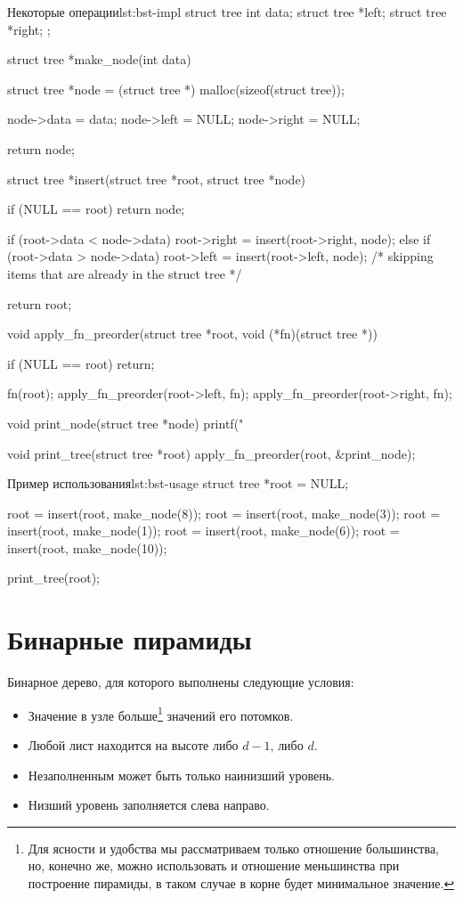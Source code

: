 \begin{clst}{Некоторые операции}{lst:bst-impl}
struct tree {
    int data;
    struct tree *left;
    struct tree *right;
};

struct tree *make_node(int data)
{
    struct tree *node = (struct tree *) malloc(sizeof(struct tree));

    node->data = data;
    node->left = NULL;
    node->right = NULL;

    return node;
}

struct tree *insert(struct tree *root, struct tree *node)
{
    if (NULL == root)
        return node;

    if (root->data < node->data)
        root->right = insert(root->right, node);
    else if (root->data > node->data)
        root->left = insert(root->left, node);
    /* skipping items that are already in the struct tree */

    return root;
}

void apply_fn_preorder(struct tree *root, void (*fn)(struct tree *))
{
    if (NULL == root)
        return;

    fn(root);
    apply_fn_preorder(root->left, fn);
    apply_fn_preorder(root->right, fn);
}

void print_node(struct tree *node) {
    printf("%
}

void print_tree(struct tree *root)
{
    apply_fn_preorder(root, &print_node);
}
\end{clst}

\begin{clst}{Пример использования}{lst:bst-usage}
struct tree *root = NULL;

root = insert(root, make_node(8));
root = insert(root, make_node(3));
root = insert(root, make_node(1));
root = insert(root, make_node(6));
root = insert(root, make_node(10));

print_tree(root);
\end{clst}

\section{Бинарные пирамиды}
\label{sec:bin-heaps}

Бинарное дерево, для которого выполнены следующие условия:
\begin{itemize}
  \item Значение в узле больше\footnote{Для ясности и удобства мы рассматриваем только отношение большинства, но, конечно же, можно использовать и отношение меньшинства при построение пирамиды, в таком случае в корне будет минимальное значение.} значений его потомков.
  \item Любой лист находится на высоте либо $d - 1$, либо $d$.
  \item Незаполненным может быть только наинизший уровень.
  \item Низший уровень заполняется слева направо.
\end{itemize}

